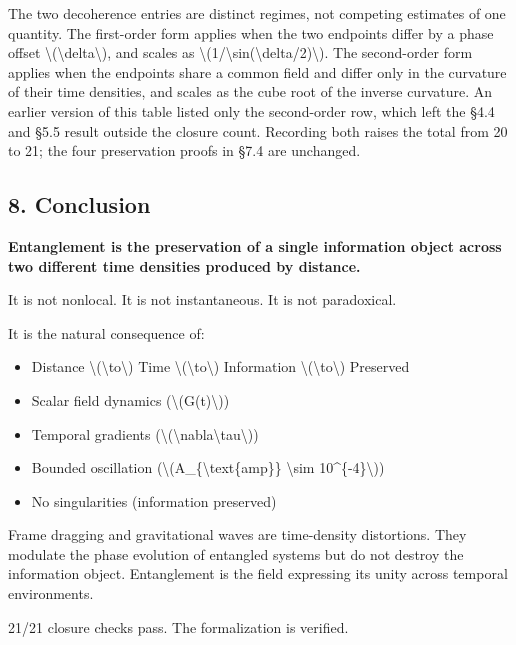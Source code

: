 \documentclass[
  10pt,
]{article}
\providecommand{\tightlist}{%
  \setlength{\itemsep}{0pt}\setlength{\parskip}{0pt}}
\begin{document}
The two decoherence entries are distinct regimes, not competing
estimates of one quantity. The first-order form applies when the two
endpoints differ by a phase offset
\textbackslash(\textbackslash delta\textbackslash), and scales as
\textbackslash(1/\textbar\textbackslash sin(\textbackslash delta/2)\textbar\textbackslash).
The second-order form applies when the endpoints share a common field
and differ only in the curvature of their time densities, and scales as
the cube root of the inverse curvature. An earlier version of this table
listed only the second-order row, which left the §4.4 and §5.5 result
outside the closure count. Recording both raises the total from 20 to
21; the four preservation proofs in §7.4 are unchanged.

\hypertarget{conclusion}{%
\subsection{8. Conclusion}\label{conclusion}}

\textbf{Entanglement is the preservation of a single information object
across two different time densities produced by distance.}

It is not nonlocal. It is not instantaneous. It is not paradoxical.

It is the natural consequence of:

\begin{itemize}
\tightlist
\item
  Distance \textbackslash(\textbackslash to\textbackslash) Time
  \textbackslash(\textbackslash to\textbackslash) Information
  \textbackslash(\textbackslash to\textbackslash) Preserved
\item
  Scalar field dynamics (\textbackslash(G(t)\textbackslash))
\item
  Temporal gradients
  (\textbackslash(\textbackslash nabla\textbackslash tau\textbackslash))
\item
  Bounded oscillation (\textbackslash(A\_\{\textbackslash text\{amp\}\}
  \textbackslash sim 10\^{}\{-4\}\textbackslash))
\item
  No singularities (information preserved)
\end{itemize}

Frame dragging and gravitational waves are time-density distortions.
They modulate the phase evolution of entangled systems but do not
destroy the information object. Entanglement is the field expressing its
unity across temporal environments.

21/21 closure checks pass. The formalization is verified.
\end{document}

